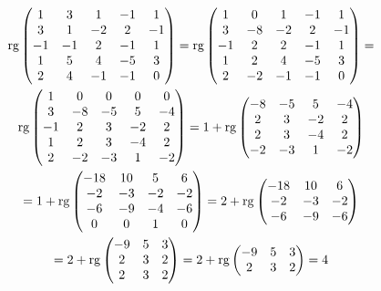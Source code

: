 \documentclass[12pt, a4paper]{article}
\begin{document}
    \begin{multline}
        \operatorname{rg} \begin{pmatrix}
                1 & 3 & 1 & -1 & 1 \\
                3 & 1 & -2 & 2 & -1 \\
                -1 & -1 & 2 & -1 & 1 \\
                1 & 5 & 4 & -5 & 3 \\
                2 & 4 & -1 & -1 & 0
        \end{pmatrix} = \operatorname{rg} \left(\begin{matrix}
            1 & 0 & 1 & -1 & 1 \\
            3 & -8 & -2 & 2 & -1 \\
            -1 & 2 & 2 & -1 & 1 \\
            1 & 2 & 4 & -5 & 3 \\
            2 & -2 & -1 & -1 & 0
        \end{matrix}\right) = \\ \operatorname{rg} \left(\begin{matrix}
            1 & 0 & 0 & 0 & 0 \\
            3 & -8 & -5 & 5 & -4 \\
            -1 & 2 & 3 & -2 & 2 \\
            1 & 2 & 3 & -4 & 2 \\
            2 & -2 & -3 & 1 & -2
        \end{matrix}\right) = 1 + \operatorname{rg} \left(\begin{matrix}
            -8 & -5 & 5 & -4 \\
            2 & 3 & -2 & 2 \\
            2 & 3 & -4 & 2 \\
            -2 & -3 & 1 & -2
        \end{matrix}\right) \\ = 1 + \operatorname{rg} \left(\begin{matrix}
           -18 & 10 &  5 & 6 \\
           -2 & -3 & -2 &  -2 \\
           -6 & -9 & -4 &  -6 \\
            0 & 0  &  1 & 0
        \end{matrix}\right) = 2 + \operatorname{rg} \left(\begin{matrix}
            -18 & 10 & 6 \\
            -2 & -3 & -2 \\
            -6 & -9 & -6
         \end{matrix}\right) \\ = 2 + \operatorname{rg} \left(\begin{matrix}
            -9 & 5 & 3 \\
            2 & 3 & 2 \\
            2 & 3 & 2
         \end{matrix}\right) = 2 + \operatorname{rg} \left(\begin{matrix}
            -9 & 5 & 3 \\
            2 & 3 & 2
         \end{matrix}\right) = 4
    \end{multline}
\end{document}
